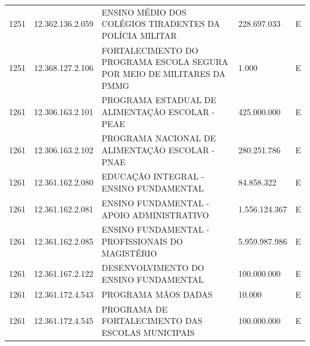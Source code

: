 \documentclass{article}
\begin{document}
\begin{longtable}[c]{m{1cm}|m{2cm}|m{10cm}|m{2cm}|m{1cm}}
\multicolumn{1}{C{1cm}|}{1251} & \multicolumn{1}{C{2cm}|}{12.362.136.2.059} & \multicolumn{1}{L{10cm}|}{ENSINO MÉDIO DOS COLÉGIOS TIRADENTES DA POLÍCIA MILITAR} & \multicolumn{1}{R{2cm}|}{228.697.033} & \multicolumn{1}{C{1cm}}{E} \\
\multicolumn{1}{C{1cm}|}{1251} & \multicolumn{1}{C{2cm}|}{12.368.127.2.106} & \multicolumn{1}{L{10cm}|}{FORTALECIMENTO DO PROGRAMA ESCOLA SEGURA POR MEIO DE MILITARES DA PMMG} & \multicolumn{1}{R{2cm}|}{1.000} & \multicolumn{1}{C{1cm}}{E} \\
\multicolumn{1}{C{1cm}|}{1261} & \multicolumn{1}{C{2cm}|}{12.306.163.2.101} & \multicolumn{1}{L{10cm}|}{PROGRAMA ESTADUAL DE ALIMENTAÇÃO ESCOLAR - PEAE} & \multicolumn{1}{R{2cm}|}{425.000.000} & \multicolumn{1}{C{1cm}}{E} \\
\multicolumn{1}{C{1cm}|}{1261} & \multicolumn{1}{C{2cm}|}{12.306.163.2.102} & \multicolumn{1}{L{10cm}|}{PROGRAMA NACIONAL DE ALIMENTAÇÃO ESCOLAR - PNAE} & \multicolumn{1}{R{2cm}|}{280.251.786} & \multicolumn{1}{C{1cm}}{E} \\
\multicolumn{1}{C{1cm}|}{1261} & \multicolumn{1}{C{2cm}|}{12.361.162.2.080} & \multicolumn{1}{L{10cm}|}{EDUCAÇÃO INTEGRAL - ENSINO FUNDAMENTAL} & \multicolumn{1}{R{2cm}|}{84.858.322} & \multicolumn{1}{C{1cm}}{E} \\
\multicolumn{1}{C{1cm}|}{1261} & \multicolumn{1}{C{2cm}|}{12.361.162.2.081} & \multicolumn{1}{L{10cm}|}{ENSINO FUNDAMENTAL - APOIO ADMINISTRATIVO} & \multicolumn{1}{R{2cm}|}{1.556.124.367} & \multicolumn{1}{C{1cm}}{E} \\
\multicolumn{1}{C{1cm}|}{1261} & \multicolumn{1}{C{2cm}|}{12.361.162.2.085} & \multicolumn{1}{L{10cm}|}{ENSINO FUNDAMENTAL - PROFISSIONAIS DO MAGISTÉRIO} & \multicolumn{1}{R{2cm}|}{5.959.987.986} & \multicolumn{1}{C{1cm}}{E} \\
\multicolumn{1}{C{1cm}|}{1261} & \multicolumn{1}{C{2cm}|}{12.361.167.2.122} & \multicolumn{1}{L{10cm}|}{DESENVOLVIMENTO DO ENSINO FUNDAMENTAL} & \multicolumn{1}{R{2cm}|}{100.000.000} & \multicolumn{1}{C{1cm}}{E} \\
\multicolumn{1}{C{1cm}|}{1261} & \multicolumn{1}{C{2cm}|}{12.361.172.4.543} & \multicolumn{1}{L{10cm}|}{PROGRAMA MÃOS DADAS} & \multicolumn{1}{R{2cm}|}{10.000} & \multicolumn{1}{C{1cm}}{E} \\
\multicolumn{1}{C{1cm}|}{1261} & \multicolumn{1}{C{2cm}|}{12.361.172.4.545} & \multicolumn{1}{L{10cm}|}{PROGRAMA DE FORTALECIMENTO DAS ESCOLAS MUNICIPAIS} & \multicolumn{1}{R{2cm}|}{100.000.000} & \multicolumn{1}{C{1cm}}{E} \\

\end{longtable}
\end{document}
